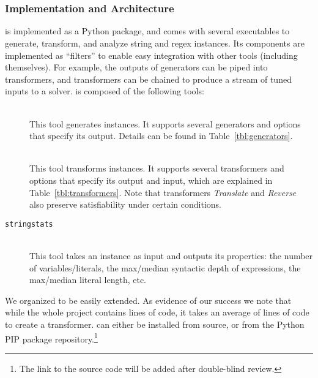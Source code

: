 \section{\fuzzer{}}
\label{sec:fuzzer}

\subsubsection{Implementation and Architecture}

\fuzzer{} is implemented as a Python package, and comes with several
executables to generate, transform, and analyze \smtfull{} string and regex
instances. Its components are implemented as \unix{} ``filters'' to enable easy
integration with other tools (including themselves). For example, the
outputs of generators can be piped into transformers, and transformers
can be chained to produce a stream of tuned inputs to a
solver. \fuzzer{} is composed of the following tools:
\begin{description}
    \item[\generator{}] \hfill \\
    This tool generates \smt{} instances. It supports several generators and
    options that specify its output. Details can be found in
    Table~\ref{tbl:generators}.
    \item[\transformer{}] \hfill \\
    This tool transforms \smt{}
    instances. It supports several transformers and options that specify
    its output and input, which are explained in
    Table~\ref{tbl:transformers}. Note that transformers
    \textit{Translate} and \textit{Reverse} also preserve
    satisfiability under certain conditions.
    \item[\texttt{stringstats}] \hfill \\
    This tool takes an \smt{}
    instance as input and outputs its properties: the number of
    variables/literals, the max/median syntactic depth of expressions, the
    max/median literal length, etc.
\end{description}
We organized \fuzzer{} to be easily extended. As evidence of our success we note
that while the whole project
contains \linesInFuzzer{} lines of code, it takes an average of
\linesPerX{} lines of code to create a transformer. \fuzzer{} can either be
installed from source, or from the Python PIP package
repository.\footnote{The link to the source code will be added after double-blind review.}

